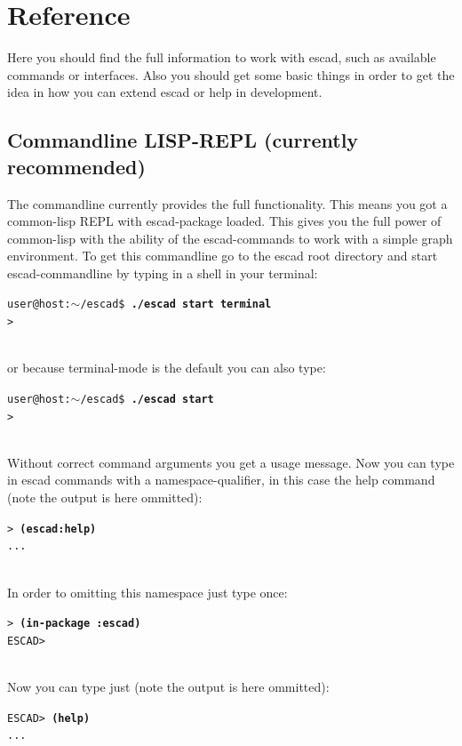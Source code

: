 \documentclass[a4paper, 12pt, openany]{scrbook}
\makeatletter
\newcommand{\shellcmdline}[2]{\\
  \setlength{\fboxsep}{2pt}\colorbox{black!20}{\parbox{\textwidth}{\texttt{user@host:$\sim$/escad\$ \textbf{#1}\\#2}}}\\}
\newcommand{\escadcmdline}[2]{\\\setlength{\fboxsep}{2pt}\colorbox{black!20}{\parbox{\textwidth}{\texttt{ESCAD> \textbf{#1}\\#2}}}\\}
\newcommand{\lispcmdline}[2]{\\\setlength{\fboxsep}{2pt}\colorbox{black!20}{\parbox{\textwidth}{\texttt{> \textbf{#1}\\#2}}}\\}
\makeatother
\begin{document}
\chapter{Reference}
Here you should find the full information to work with escad, such as available commands or interfaces. Also you should get some basic things in order to get the idea in how you can extend escad or help in development.
\section{Commandline LISP-REPL (currently recommended)}\label{sec:cmd_line}
The commandline currently provides the full functionality. This means you got a common-lisp REPL with escad-package loaded. This gives you the full power of common-lisp with the ability of the escad-commands to work with a simple graph environment. To get this commandline go to the escad root directory and start escad-commandline by typing in a shell in your terminal:
\shellcmdline{./escad start terminal}{>}
or because terminal-mode is the default you can also type:
\shellcmdline{./escad start}{>}
Without correct command arguments you get a usage message.
Now you can type in escad commands with a namespace-qualifier, in this case the help command (note the output is here ommitted):
\lispcmdline{(escad:help)}{...}
In order to omitting this namespace just type once:
\lispcmdline{(in-package :escad)}{ESCAD>}
Now you can type just (note the output is here ommitted):
\escadcmdline{(help)}{...}
\end{document}
